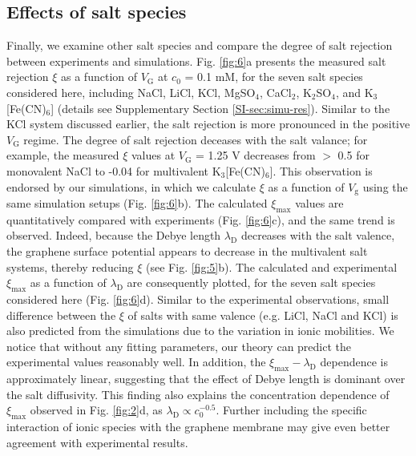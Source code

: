 \documentclass[journal=langd5,email=true, hyperref=true, keywords=false]{achemso}
\newcommand{\Fig}{Fig.}
\begin{document}
\subsection{Effects of salt species}
\label{sec:salts}

Finally, we examine other salt species and compare the degree of salt
rejection between experiments and simulations. \Fig{} \ref{fig:6}a
presents the measured salt rejection $\xi$ as a function of
$V_{\mathrm{G}}$ at $c_{0}$ = 0.1 mM, for the seven salt species
considered here, including NaCl, LiCl, KCl, MgSO$_{4}$, CaCl$_{2}$,
K$_{2}$SO$_{4}$, and K$_{3}$[Fe(CN)$_{6}$] (details see Supplementary
Section \ref{SI-sec:simu-res}). Similar to the KCl system discussed
earlier, the salt rejection is more pronounced in the positive
$V_{\mathrm{G}}$ regime. The degree of salt rejection deceases with
the salt valance; for example, the measured $\xi$ values at
$V_{\mathrm{G}}$ = 1.25 V decreases from $>$ 0.5 for monovalent NaCl
to -0.04 for multivalent K$_{3}$[Fe(CN)$_{6}$]. This observation is
endorsed by our simulations, in which we calculate $\xi$ as a function
of $V_{\mathrm{g}}$ using the same simulation setups (\Fig{}
\ref{fig:6}b). The calculated $\xi_{\mathrm{max}}$ values are
quantitatively compared with experiments (\Fig{} \ref{fig:6}c), and
the same trend is observed. Indeed, because the Debye length
$\lambda_{\mathrm{D}}$ decreases with the salt valence, the graphene
surface potential appears to decrease in the multivalent salt systems,
thereby reducing $\xi$ (see \Fig{} \ref{fig:5}b). The calculated and
experimental $\xi_{\mathrm{max}}$ as a function of
$\lambda_{\mathrm{D}}$ are consequently plotted, for the seven salt
species considered here (\Fig{} \ref{fig:6}d). Similar to the
experimental observations, small difference between the $\xi$ of salts
with same valence (e.g. LiCl, NaCl and KCl) is also predicted from the
simulations due to the variation in ionic mobilities. We notice that
without any fitting parameters, our theory can predict the
experimental values reasonably well.  In addition, the
$\xi_{\mathrm{max}}-\lambda_{\mathrm{D}}$ dependence is approximately
linear, suggesting that the effect of Debye length is dominant over
the salt diffusivity. This finding also explains the concentration
dependence of $\xi_{\mathrm{max}}$ observed in \Fig{} \ref{fig:2}d, as
$\lambda_{\mathrm{D}} \propto c_{0}^{-0.5}$. Further including the
specific interaction of ionic species with the graphene membrane
\cite{Ghosh_2018} may give even better agreement with experimental
results.
\end{document}
